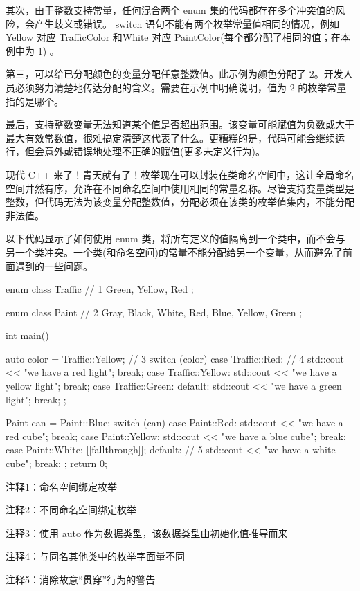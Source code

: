 其次，由于整数支持常量，任何混合两个 enum 集的代码都存在多个冲突值的风险，会产生歧义或错误。 switch 语句不能有两个枚举常量值相同的情况，例如 Yellow 对应 TrafficColor 和White 对应 PaintColor(每个都分配了相同的值；在本例中为 1) 。

第三，可以给已分配颜色的变量分配任意整数值。此示例为颜色分配了 2。开发人员必须努力清楚地传达分配的含义。需要在示例中明确说明，值为 2 的枚举常量指的是哪个。

最后，支持整数变量无法知道某个值是否超出范围。该变量可能赋值为负数或大于最大有效常数值，很难搞定清楚这代表了什么。更糟糕的是，代码可能会继续运行，但会意外或错误地处理不正确的赋值(更多未定义行为)。


现代 C++ 来了！青天就有了！枚举现在可以封装在类命名空间中，这让全局命名空间井然有序，允许在不同命名空间中使用相同的常量名称。尽管支持变量类型是整数，但代码无法为该变量分配整数值，分配必须在该类的枚举值集内，不能分配非法值。

以下代码显示了如何使用 enum 类，将所有定义的值隔离到一个类中，而不会与另一个类冲突。一个类(和命名空间)的常量不能分配给另一个变量，从而避免了前面遇到的一些问题。


\begin{cpp}
enum class Traffic { // 1
  Green,
  Yellow,
  Red
};

enum class Paint { // 2
  Gray,
  Black,
  White,
  Red,
  Blue,
  Yellow,
  Green
};

int main() {
  auto color = Traffic::Yellow; // 3
  switch (color) {
  case Traffic::Red: // 4
    std::cout << "we have a red light\n";
    break;
  case Traffic::Yellow:
    std::cout << "we have a yellow light\n";
    break;
  case Traffic::Green:
  default:
    std::cout << "we have a green light\n";
    break;
  };

  Paint can = Paint::Blue;
  switch (can) {
  case Paint::Red:
    std::cout << "we have a red cube\n";
    break;
  case Paint::Yellow:
    std::cout << "we have a blue cube\n";
    break;
  case Paint::White:
    [[fallthrough]];
  default: // 5
    std::cout << "we have a white cube\n";
    break;
  };
  return 0;
}
\end{cpp}

{\footnotesize
注释1：命名空间绑定枚举

注释2：不同命名空间绑定枚举

注释3：使用 auto 作为数据类型，该数据类型由初始化值推导而来

注释4：与同名其他类中的枚举字面量不同

注释5：消除故意“贯穿”行为的警告
}

